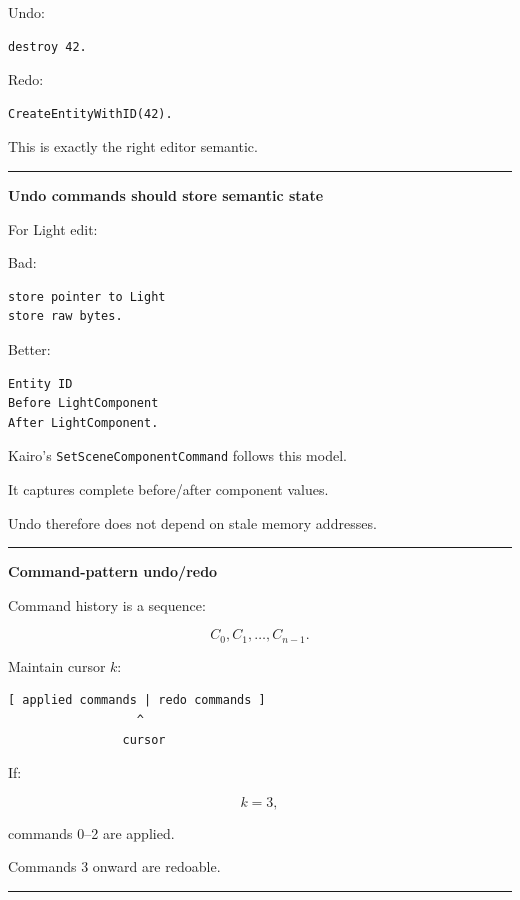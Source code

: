 Undo:

\begin{verbatim}
destroy 42.
\end{verbatim}

Redo:

\begin{verbatim}
CreateEntityWithID(42).
\end{verbatim}

This is exactly the right editor semantic.

\begin{center}\rule{0.5\linewidth}{0.5pt}\end{center}

\textbf{Undo commands should store semantic state}

For Light edit:

Bad:

\begin{verbatim}
store pointer to Light
store raw bytes.
\end{verbatim}

Better:

\begin{verbatim}
Entity ID
Before LightComponent
After LightComponent.
\end{verbatim}

Kairo's \texttt{SetSceneComponentCommand} follows this model.

It captures complete before/after component values.

Undo therefore does not depend on stale memory addresses.

\begin{center}\rule{0.5\linewidth}{0.5pt}\end{center}

\textbf{Command-pattern undo/redo}

Command history is a sequence:

\[
C_0,C_1,\dots,C_{n-1}.
\]

Maintain cursor \(k\):

\begin{verbatim}
[ applied commands | redo commands ]
                  ^
                cursor
\end{verbatim}

If:

\[
k=3,
\]

commands 0--2 are applied.

Commands 3 onward are redoable.

\begin{center}\rule{0.5\linewidth}{0.5pt}\end{center}


